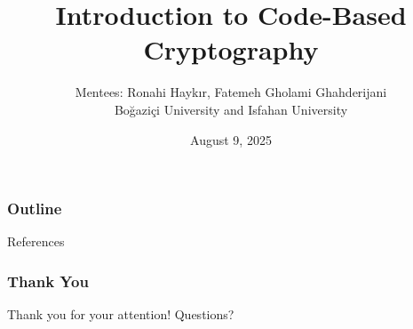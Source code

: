 \documentclass[aspectratio=169,10pt]{beamer}
\title[Code-Based Cryptography]{Introduction to Code-Based Cryptography}
\author[R. Haykır, F. Gholami Ghahderijani]{Mentees: Ronahi Haykır, Fatemeh Gholami Ghahderijani\\ Boğaziçi  University and Isfahan University}
\institute[]{
Mentor: Dr. Yağmur Çakıroğlu
\\Hacettepe University
}
\date{August 9, 2025}
\begin{document}
\begin{frame}
    \titlepage
\end{frame}


\begin{frame}
    \frametitle{Outline}
    \tableofcontents
\end{frame}




 


\begin{frame}{References}
    \nocite{*}   
    
          
\end{frame}




\begin{frame}
    \frametitle{Thank You}
    \begin{center}
\Large Thank you for your attention! Questions?
    \end{center}
\end{frame}
\end{document}
